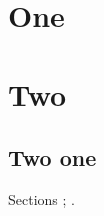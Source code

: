\documentclass{article}
\begin{document}
\section{One}\label{s1}
\section{Two}\label{s2}
\subsection{Two one}\label{ss1}
Sections ; .
\end{document}
